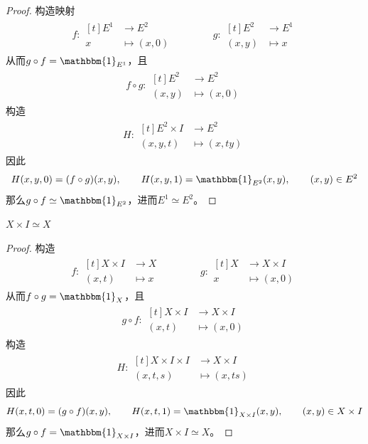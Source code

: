 \documentclass[lang = cn, scheme = chinese, thmcnt = section, usesamecnt]{elegantbook}
\begin{document}
\begin{proof}
	构造映射
	\begin{align*}
		f:\begin{aligned}[t]
			E^1&\longrightarrow E^2\\
			x&\longmapsto (x,0)
		\end{aligned}\qquad\qquad
		g:\begin{aligned}[t]
			E^2&\longrightarrow E^1\\
			(x,y)&\longmapsto x
		\end{aligned}
	\end{align*}
	从而$g\circ f=\mathbbm{1}_{E^1}$，且
	\begin{align*}
		f\circ g:\begin{aligned}[t]
			E^2&\longrightarrow E^2\\
			(x,y)&\longmapsto (x,0)
		\end{aligned}
	\end{align*}
	构造
	\begin{align*}
		H:\begin{aligned}[t]
			E^2\times I &\longrightarrow E^2\\
			(x,y,t)&\longmapsto (x,ty)
		\end{aligned}
	\end{align*}
	因此%
	$$
	H(x,y,0)=(f\circ g)(x,y),\qquad
	H(x,y,1)=\mathbbm{1}_{E^2}(x,y),\qquad
	(x,y)\in E^2
	$$
	那么$g\circ f\simeq\mathbbm{1}_{E^2}$，进而$E^1\simeq E^2$。
\end{proof}

\begin{example}
	$X\times  I \simeq X$
\end{example}

\begin{proof}
	构造
	\begin{align*}
		f:\begin{aligned}[t]
			X\times I &\longrightarrow X\\
			(x,t)&\longmapsto x
		\end{aligned}\qquad\qquad
		g:\begin{aligned}[t]
			X&\longrightarrow X\times I \\
			x&\longmapsto (x,0)
		\end{aligned}
	\end{align*}
	从而$f\circ g=\mathbbm{1}_{X}$，且
	\begin{align*}
		g\circ f:\begin{aligned}[t]
			X\times I &\longrightarrow X\times I \\
			(x,t)&\longmapsto (x,0)
		\end{aligned}
	\end{align*}
	构造
	\begin{align*}
		H:\begin{aligned}[t]
			X\times I \times I &\longrightarrow X\times I \\
			(x,t,s)&\longmapsto (x,ts)
		\end{aligned}
	\end{align*}
	因此
	$$
	H(x,t,0)=(g\circ f)(x,y),\qquad
	H(x,t,1)=\mathbbm{1}_{X\times I}(x,y),\qquad
	(x,y)\in X\times I
	$$
	那么$g\circ f=\mathbbm{1}_{X\times I}$，进而$X\times  I \simeq X$。
\end{proof}
\end{document}
